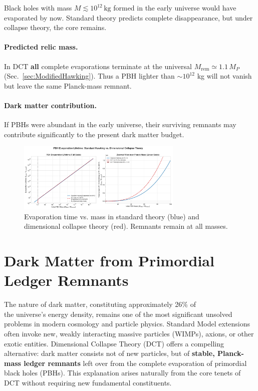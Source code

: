 \documentclass[a4paper, 12pt, oneside]{book}
\numberwithin{equation}{chapter}
\begin{document}
Black holes with mass \( M \lesssim 10^{12} \,\mathrm{kg} \) formed
in the early universe would have evaporated by now. Standard theory predicts
complete disappearance, but under collapse theory, the core remains.

\paragraph{Predicted relic mass.}
In DCT \textbf{all} complete evaporations terminate at the universal $M_{\text{rem}}\simeq1.1\,M_P$ (Sec.~\ref{sec:ModifiedHawking}). Thus a PBH lighter than $\sim10^{12}$ kg will not vanish but leave the same Planck-mass remnant.

\paragraph{Dark matter contribution.}
If PBHs were abundant in the early universe, their surviving remnants
may contribute significantly to the present dark matter budget.

\begin{figure}[ht]
    \centering
    \includegraphics[width=0.7\textwidth]{figures/pbh_evaporation.pdf}
    \caption[Evaporation time vs. mass]{Evaporation time vs. mass in standard theory (blue) and
    dimensional collapse theory (red). Remnants remain at all masses.}
    \label{fig:pbh-lifetime}
\end{figure}

\section[Dark Matter from Ledger Remnants]{Dark Matter from Primordial Ledger Remnants}
\label{sec:DCRemnantsDM}

The nature of dark matter, constituting approximately 26\% of \\ the universe's energy density, remains one of the most significant unsolved problems in modern cosmology and particle physics. Standard Model extensions often invoke new, weakly interacting massive particles (WIMPs), axions, or other exotic entities. Dimensional Collapse Theory (DCT) offers a compelling alternative: dark matter consists not of new particles, but of \textbf{stable, Planck-mass ledger remnants} left over from the complete evaporation of primordial black holes (PBHs). This explanation arises naturally from the core tenets of DCT without requiring new fundamental constituents.
\end{document}
